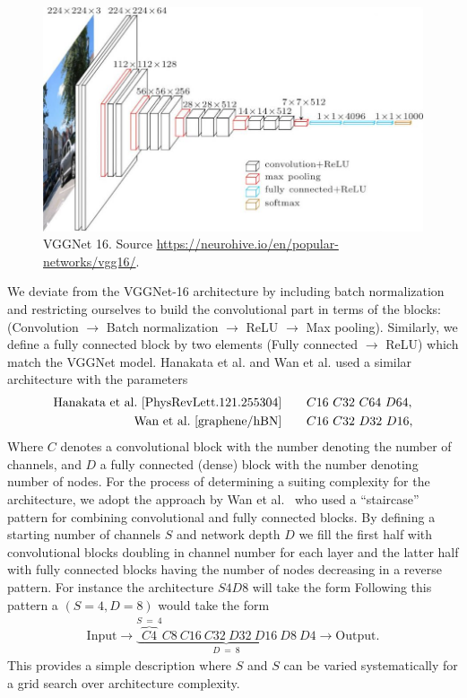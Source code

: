 \begin{figure}[H]
  \centering
  \includegraphics[width=0.7\linewidth]{figures/ML/VGGNet16.jpg}
  \caption{VGGNet 16. Source \url{https://neurohive.io/en/popular-networks/vgg16/}.}
  \label{fig:VGGNet16}
\end{figure}

We deviate from the VGGNet-16 architecture by including batch normalization and restricting ourselves to build the convolutional part in terms of the blocks: (Convolution $\to$ Batch normalization $\to$ ReLU $\to$ Max pooling). Similarly, we define a fully connected block by two elements (Fully connected $\to$ ReLU) which match the VGGNet model. Hanakata et al. and Wan et al. used a similar architecture with the parameters 
\begin{align*}
  \text{Hanakata et al.~\cite{PhysRevLett.121.255304}} & \qquad C16 \ C32 \ C64 \ D64, \\ 
  \text{Wan et al.~\cite{graphene/hBN}} & \qquad C16 \ C32 \ D32 \ D16,
\end{align*}
Where $C$ denotes a convolutional block with the number denoting the number of channels, and $D$ a fully connected (dense) block with the number denoting number of nodes. For the process of determining a suiting complexity for the architecture, we adopt the approach by Wan et al.~\cite{graphene/hBN} who used a ``staircase'' pattern for combining convolutional and fully connected blocks. By defining a starting number of channels $S$ and network depth $D$ we fill the first half with convolutional blocks doubling in channel number for each layer and the latter half with fully connected blocks having the number of nodes decreasing in a reverse pattern. For instance the architecture $S4D8$ will take the form
Following this pattern a $(S=4, D=8)$ would take the form
\begin{align*}
  \text{Input} \to \underbrace{\overbrace{C4}^{S \ = \ 4}C8 \ C16 \ C32 \ D32 \ D16 \ D8 \ D4}_{D \ = \ 8} \to \text{Output}.
\end{align*} 
This provides a simple description where $S$ and $S$  can be varied systematically for a grid search over architecture complexity. 


